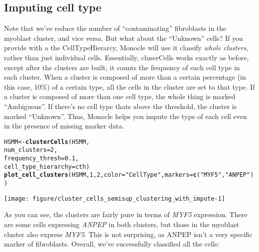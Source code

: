 \documentclass[10pt,oneside]{article}\usepackage[]{graphicx}\usepackage[]{color}
\makeatletter
\def\maxwidth{ %
  \ifdim\Gin@nat@width>\linewidth
    \linewidth
  \else
    \Gin@nat@width
  \fi
}
\newcommand{\hlnum}[1]{\textcolor[rgb]{0.686,0.059,0.569}{#1}}%
\newcommand{\hlstr}[1]{\textcolor[rgb]{0.192,0.494,0.8}{#1}}%
\newcommand{\hlstd}[1]{\textcolor[rgb]{0.345,0.345,0.345}{#1}}%
\newcommand{\hlkwb}[1]{\textcolor[rgb]{0.69,0.353,0.396}{#1}}%
\newcommand{\hlkwc}[1]{\textcolor[rgb]{0.333,0.667,0.333}{#1}}%
\newcommand{\hlkwd}[1]{\textcolor[rgb]{0.737,0.353,0.396}{\textbf{#1}}}%
\newenvironment{kframe}{%
 \def\at@end@of@kframe{}%
 \ifinner\ifhmode%
  \def\at@end@of@kframe{\end{minipage}}%
  \begin{minipage}{\columnwidth}%
 \fi\fi%
 \def\FrameCommand##1{\hskip\@totalleftmargin \hskip-\fboxsep
 \colorbox{shadecolor}{##1}\hskip-\fboxsep
     \hskip-\linewidth \hskip-\@totalleftmargin \hskip\columnwidth}%
 \MakeFramed {\advance\hsize-\width
   \@totalleftmargin\z@ \linewidth\hsize
   \@setminipage}}%
 {\par\unskip\endMakeFramed%
 \at@end@of@kframe}
\newenvironment{knitrout}{}{} %
\makeatother
\begin{document}
 \subsection{Imputing cell type}
 
 Note that we've reduce the number of ``contaminating'' fibroblasts in the myoblast cluster, and vice versa. But what about the ``Unknown'' cells? If you provide  with a the CellTypeHierarcy, Monocle will use it classify \emph{whole clusters}, rather than just individual cells. Essentially, cluserCells works exactly as before, except after the clusters are built, it counts the frequency of each cell type in each cluster. When a cluster is composed of more than a certain percentage (in this case, 10\%) of a certain type, all the cells in the cluster are set to that type. If a cluster is composed of more than one cell type, the whole thing is marked ``Ambiguous''. If there's no cell type thats above the threshold, the cluster is marked ``Unknown''. Thus, Monocle helps you impute the type of each cell even in the presence of missing marker data.
 
\begin{knitrout}
\color{fgcolor}\begin{kframe}
\begin{alltt}
\hlstd{HSMM} \hlkwb{<-} \hlkwd{clusterCells}\hlstd{(HSMM,}
                     \hlkwc{num_clusters}\hlstd{=}\hlnum{2}\hlstd{,}
                     \hlkwc{frequency_thresh}\hlstd{=}\hlnum{0.1}\hlstd{,}
                     \hlkwc{cell_type_hierarchy}\hlstd{=cth)}
\hlkwd{plot_cell_clusters}\hlstd{(HSMM,} \hlnum{1}\hlstd{,} \hlnum{2}\hlstd{,} \hlkwc{color}\hlstd{=}\hlstr{"CellType"}\hlstd{,} \hlkwc{markers} \hlstd{=} \hlkwd{c}\hlstd{(}\hlstr{"MYF5"}\hlstd{,} \hlstr{"ANPEP"}\hlstd{))}
\end{alltt}
\end{kframe}

{\centering \texttt{[image: figure/cluster\_cells\_semisup\_clustering\_with\_impute-1]} 

}



\end{knitrout}
 
As you can see, the clusters are fairly pure in terms of \emph{MYF5} expression. There are some cells expressing \emph{ANPEP} in both clusters, but those in the myoblast cluster also express \emph{MYF5}. This is not surprising, as ANPEP isn't a very specific marker of fibroblasts. Overall, we've successfully classified all the cells:
 
\end{document}
